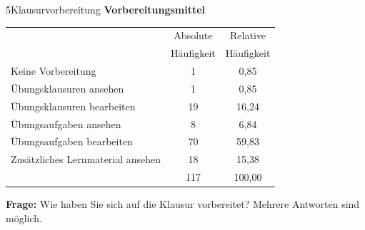 \documentclass[xcolor=table,9pt,aspectratio=169]{beamer}
\begin{document}
\begin{frame}{\vspace*{10mm}5\hspace*{1em}Klausurvorbereitung}
\textbf{Vorbereitungsmittel}\\

\medskip
\begin{tabular}{lcc}
   \arrayrulecolor{blue2}\hline
                                       & Absolute     & Relative     \\
                                       & Häufigkeit   & Häufigkeit   \\
   \hline\hline
   Keine Vorbereitung                  &   1          &   0,85       \\
   Übungsklausuren ansehen             &   1          &   0,85       \\
   Übungsklausuren bearbeiten          &  19          &  16,24       \\
   Übungsaufgaben ansehen              &   8          &   6,84       \\
   Übungsaufgaben bearbeiten           &  70          &  59,83       \\
   Zusätzliches Lernmaterial ansehen   &  18          &  15,38       \\
   \hline
                                       & 117          & 100,00       \\
   \hline
\end{tabular}

\bigskip
\textbf{Frage:} Wie haben Sie sich auf die Klausur vorbereitet? Mehrere Antworten sind möglich.
\end{frame}
\end{document}

